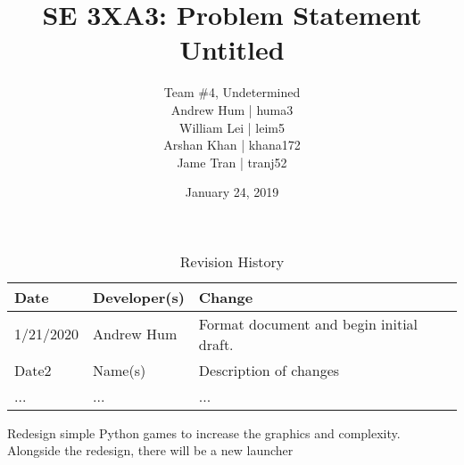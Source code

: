 \documentclass{article}
\title{SE 3XA3: Problem Statement\\Untitled}
\author{Team \#4, Undetermined
		\\ Andrew Hum | huma3
		\\ William Lei | leim5
		\\ Arshan Khan | khana172
		\\ Jame Tran | tranj52
}
\date{January 24, 2019}
\begin{document}
\begin{table}[hp]
\caption{Revision History} \label{TblRevisionHistory}
\begin{tabularx}{\textwidth}{llX}
\toprule
\textbf{Date} & \textbf{Developer(s)} & \textbf{Change}\\
\midrule
1/21/2020 & Andrew Hum & Format document and begin initial draft.\\
Date2 & Name(s) & Description of changes\\
... & ... & ...\\
\bottomrule
\end{tabularx}
\end{table}

\newpage

\maketitle

Redesign simple Python games to increase the graphics and complexity.
Alongside the redesign, there will be a new launcher  





\end{document}
